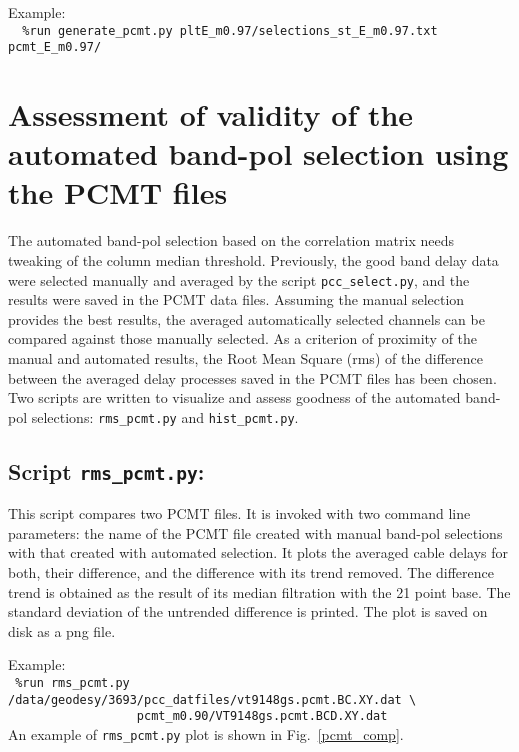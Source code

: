 \documentclass[preprint]{aastex}
\begin{document}
Example: \\
\verb$  %run generate_pcmt.py pltE_m0.97/selections_st_E_m0.97.txt pcmt_E_m0.97/$



\section{Assessment of validity of the automated band-pol selection using the PCMT files}

The automated band-pol selection based on the correlation matrix needs tweaking of the column median threshold. Previously, the good band delay data were selected manually and averaged by the script \verb$pcc_select.py$, and the results were saved in the PCMT data files. Assuming the manual selection provides the best results, the averaged automatically selected channels can be compared against those manually selected. As a criterion of proximity of the manual and automated results, the Root Mean Square (rms) of the difference between the averaged delay processes saved in the PCMT files has been chosen. Two scripts are written to visualize and assess goodness of the automated band-pol selections: \verb$rms_pcmt.py$ and \verb$hist_pcmt.py$.

\subsection{Script \texttt{rms\_pcmt.py}: }

This script compares two PCMT files. It is invoked with two command line parameters: the name of the PCMT file created with manual band-pol selections with that created with automated selection. It plots the averaged cable delays for both, their difference, and the difference with its trend removed. The difference trend is obtained as the result of its median filtration with the 21 point base. The standard deviation of the untrended difference is printed. The plot is saved on disk as a png file.

Example: \\
\verb$ %run rms_pcmt.py /data/geodesy/3693/pcc_datfiles/vt9148gs.pcmt.BC.XY.dat \$ \\
\verb$                  pcmt_m0.90/VT9148gs.pcmt.BCD.XY.dat$ \\

An example of \texttt{rms\_pcmt.py} plot is shown in Fig.~\ref{pcmt_comp}.

\begin{figure*}   [ht!]
\caption{\small An example of \texttt{rms\_pcmt.py} output.
\label{pcmt_comp}}
\end{figure*}
\end{document}
